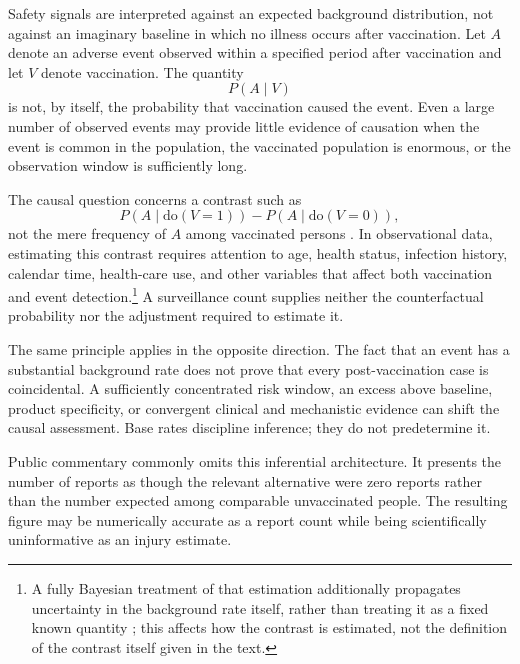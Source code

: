 \documentclass[11pt]{article}
\begin{document}
Safety signals are interpreted against an expected background distribution, not against an imaginary baseline in which no illness occurs after vaccination. Let $A$ denote an adverse event observed within a specified period after vaccination and let $V$ denote vaccination. The quantity
\[
P(A \mid V)
\]
is not, by itself, the probability that vaccination caused the event. Even a large number of observed events may provide little evidence of causation when the event is common in the population, the vaccinated population is enormous, or the observation window is sufficiently long.

The causal question concerns a contrast such as
\[
P(A \mid \text{do}(V=1)) - P(A \mid \text{do}(V=0)),
\]
not the mere frequency of $A$ among vaccinated persons \citep{pearl2009,pearl2010}. In observational data, estimating this contrast requires attention to age, health status, infection history, calendar time, health-care use, and other variables that affect both vaccination and event detection.\footnote{A fully Bayesian treatment of that estimation additionally propagates uncertainty in the background rate itself, rather than treating it as a fixed known quantity \citep{broemeling2013}; this affects how the contrast is estimated, not the definition of the contrast itself given in the text.} A surveillance count supplies neither the counterfactual probability nor the adjustment required to estimate it.

The same principle applies in the opposite direction. The fact that an event has a substantial background rate does not prove that every post-vaccination case is coincidental. A sufficiently concentrated risk window, an excess above baseline, product specificity, or convergent clinical and mechanistic evidence can shift the causal assessment. Base rates discipline inference; they do not predetermine it.

Public commentary commonly omits this inferential architecture. It presents the number of reports as though the relevant alternative were zero reports rather than the number expected among comparable unvaccinated people. The resulting figure may be numerically accurate as a report count while being scientifically uninformative as an injury estimate.
\end{document}
